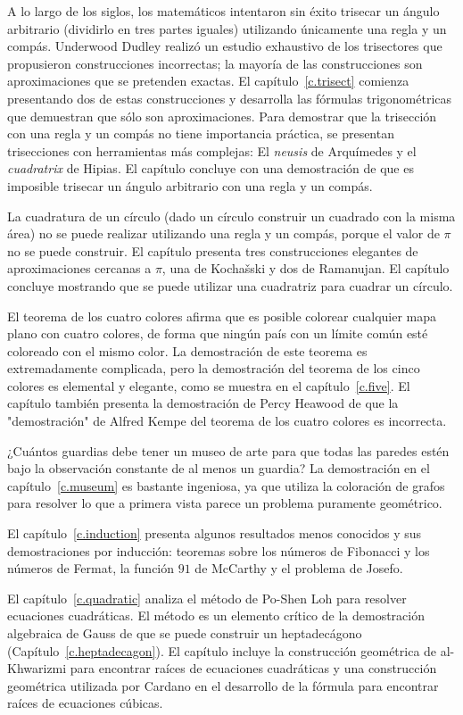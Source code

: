 A lo largo de los siglos, los matemáticos intentaron sin éxito trisecar un ángulo arbitrario (dividirlo en tres partes iguales) utilizando únicamente una regla y un compás. Underwood Dudley realizó un estudio exhaustivo de los trisectores que propusieron construcciones incorrectas; la mayoría de las construcciones son aproximaciones que se pretenden exactas. El capítulo~\ref{c.trisect} comienza presentando dos de estas construcciones y desarrolla las fórmulas trigonométricas que demuestran que sólo son aproximaciones. Para demostrar que la trisección con una regla y un compás no tiene importancia práctica, se presentan trisecciones con herramientas más complejas: El \emph{neusis} de Arquímedes y el \emph{cuadratrix} de Hipias. El capítulo concluye con una demostración de que es imposible trisecar un ángulo arbitrario con una regla y un compás. 

La cuadratura de un círculo (dado un círculo construir un cuadrado con la misma área) no se puede realizar utilizando una regla y un compás, porque el valor de $\pi$ no se puede construir. El capítulo presenta tres construcciones elegantes de aproximaciones cercanas a $\pi$, una de Kochašski y dos de Ramanujan. El capítulo concluye mostrando que se puede utilizar una cuadratriz para cuadrar un círculo.

El teorema de los cuatro colores afirma que es posible colorear cualquier mapa plano con cuatro colores, de forma que ningún país con un límite común esté coloreado con el mismo color. La demostración de este teorema es extremadamente complicada, pero la demostración del teorema de los cinco colores es elemental y elegante, como se muestra en el capítulo~\ref{c.five}. El capítulo también presenta la demostración de Percy Heawood de que la "demostración" de Alfred Kempe del teorema de los cuatro colores es incorrecta.

¿Cuántos guardias debe tener un museo de arte para que todas las paredes estén bajo la observación constante de al menos un guardia? La demostración en el capítulo~\ref{c.museum} es bastante ingeniosa, ya que utiliza la coloración de grafos para resolver lo que a primera vista parece un problema puramente geométrico.

El capítulo~\ref{c.induction} presenta algunos resultados menos conocidos y sus demostraciones por inducción: teoremas sobre los números de Fibonacci y los números de Fermat, la función $91$ de McCarthy y el problema de Josefo.

El capítulo~\ref{c.quadratic} analiza el método de Po-Shen Loh para resolver ecuaciones cuadráticas. El método es un elemento crítico de la demostración algebraica de Gauss de que se puede construir un heptadecágono (Capítulo~\ref{c.heptadecagon}). El capítulo incluye la construcción geométrica de al-Khwarizmi para encontrar raíces de ecuaciones cuadráticas y una construcción geométrica utilizada por Cardano en el desarrollo de la fórmula para encontrar raíces de ecuaciones cúbicas.

